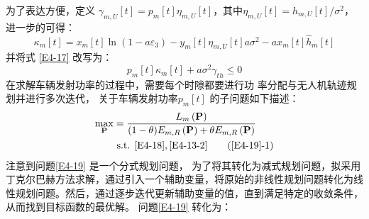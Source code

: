 为了表达方便，定义  %
$\gamma_{m,U}\left[t\right]=p_m\left[t\right]\eta_{m,U}\left[t\right]$，其中$\eta_{m,U}\left[t\right]=h_{m,U}\left[t\right]/{\sigma^2}$，进一步的可得：
\begin{equation} \label{E4-1833}
{{\kappa }_{m}}\left[ t \right]={{x}_{m}}\left[ t \right]\ln \left( 1-a{{\varepsilon }_{3}} \right)-{{y}_{m}}\left[ t \right]{{\eta }_{m,U}}\left[ t \right]a{{\sigma }^{2}}-a{{x}_{m}}\left[ t \right]{{\hat{h}}\phantom{}_{m}}\left[ t \right]
\end{equation}
并将式 \eqref{E4-17} 改写为：%
\begin{equation} \label{E4-18}
{{p}_{m}}\left[ t \right]{{\kappa }_{m}}\left[ t \right]+a{{\sigma }^{2}}{{\gamma }_{th}}\le 0
\end{equation}
在求解车辆发射功率的过程中，需要每个时隙都要进行功
率分配与无人机轨迹规划并进行多次迭代，
关于车辆发射功率$p_m\left[t\right]$ 的子问题如下描述：
\begin{align}  \label{E4-19}
\max _{ \mathbf{P}} &   ={\frac{{{L}_{m}}\left( \mathbf{P} \right)}
{(1-\theta){E}_{m,R}\left( \mathbf{P} \right)+\theta{E}_{m,R}\left( \mathbf{P} \right)}}        \\
&\text { s.t. }
 \eqref{E4-18},\eqref{E4-13-2}                                                  \tag{\ref{E4-19}{-1}}      \label{E4-19-1}
\end{align}
注意到问题\eqref{E4-19} 是一个分式规划问题，
为了将其转化为减式规划问题，拟采用丁克尔巴赫方法求解，通过引入一个辅助变量，将原始的非线性规划问题转化为线性规划问题。然后，通过逐步迭代更新辅助变量的值，直到满足特定的收敛条件，从而找到目标函数的最优解。
问题\eqref{E4-19} 转化为：
